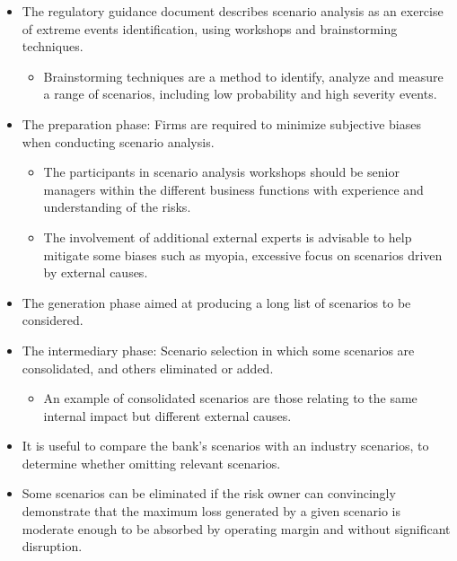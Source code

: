 \begin{itemize}
\item The regulatory guidance document describes scenario analysis as an exercise of extreme events identification, using workshops and brainstorming techniques.
    \begin{itemize}
    \item Brainstorming techniques are a method to identify, analyze and measure a range of scenarios, including low probability and high severity events.
    \end{itemize}
\item The preparation phase: Firms are required to minimize subjective biases when conducting scenario analysis.
    \begin{itemize}
    \item The participants in scenario analysis workshops should be senior managers within the different business functions with experience and understanding of the risks.
    \item  The involvement of additional external experts is advisable to help mitigate some biases such as myopia, excessive focus on scenarios driven by external causes.
    \end{itemize}
\item The generation phase aimed at producing a long list of scenarios to be considered.
\item  The intermediary phase: Scenario selection in which some scenarios are consolidated, and others eliminated or added.
    \begin{itemize}
    \item An example of consolidated scenarios are those relating to the same internal impact but different external causes.
    \end{itemize}
\item It is useful to compare the bank's scenarios with an industry scenarios, to determine whether omitting relevant scenarios.
\item  Some scenarios can be eliminated if the risk owner can convincingly demonstrate that the maximum loss generated by a given scenario is moderate enough to be absorbed by operating margin and without significant disruption.

\end{itemize}





